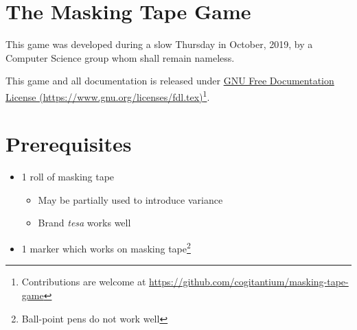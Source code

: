 \documentclass[12pt, a4paper]{article}
\begin{document}
\section{The Masking Tape Game}
This game was developed during a slow Thursday in October, 2019, by a Computer Science group whom shall remain nameless. 

This game and all documentation is released under \href{https://www.gnu.org/licenses/fdl.tex}{GNU Free Documentation License (\url{https://www.gnu.org/licenses/fdl.tex})}\footnote{Contributions are welcome at \url{https://github.com/cogitantium/masking-tape-game}}.

\section{Prerequisites}
\begin{itemize}
    \item 1 roll of masking tape
    \begin{itemize}
        \item May be partially used to introduce variance
        \item Brand \textit{tesa\textsuperscript{\textregistered}} works well
    \end{itemize}
    \item 1 marker which works on masking tape\footnote{Ball-point pens do not work well}
\end{itemize}
\end{document}
